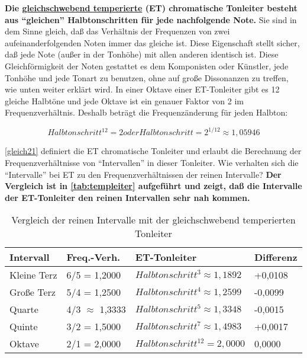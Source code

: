 \label{et1}

\textbf{Die \hyperref[et]{gleichschwebend temperierte} (ET) chromatische Tonleiter besteht aus \enquote{gleichen} Halbtonschritten für jede nachfolgende Note.}
Sie sind in dem Sinne gleich, daß das Verhältnis der Frequenzen von zwei aufeinanderfolgenden Noten immer das gleiche ist.
Diese Eigenschaft stellt sicher, daß jede Note (außer in der Tonhöhe) mit allen anderen identisch ist.
Diese Gleichförmigkeit der Noten gestattet es dem Komponisten oder Künstler, jede Tonhöhe und jede Tonart zu benutzen, ohne auf große Dissonanzen zu treffen, wie unten weiter erklärt wird.
In einer Oktave einer ET-Tonleiter gibt es 12 gleiche Halbtöne und jede Oktave ist ein genauer Faktor von 2 im Frequenzverhältnis.
Deshalb beträgt die Frequenzänderung für jeden Halbton:


\begin{equation}
 \label{gleich21}
 Halbtonschritt^{12} = 2 oder Halbtonschritt = 2^{1/12} \approx 1,05946
\end{equation}


\autoref{gleich21} definiert die ET chromatische Tonleiter und erlaubt die Berechnung der Frequenzverhältnisse von \enquote{Intervallen} in dieser Tonleiter.
Wie verhalten sich die \enquote{Intervalle} bei ET zu den Frequenzverhältnissen der reinen Intervalle?
\textbf{Der Vergleich ist in \autoref{tab:templeiter} aufgeführt und zeigt, daß die Intervalle der ET-Tonleiter den reinen Intervallen sehr nah kommen.}

\begin{table}
 \caption{Vergleich der reinen Intervalle mit der gleichschwebend temperierten Tonleiter}
 \begin{tabular}{l|l|l|l}
 \label{tab:templeiter}
 \textbf{Intervall} & \textbf{Freq.-Verh.} & \textbf{ET-Tonleiter} & \textbf{Differenz} \\
 \hline
 Kleine Terz & 6/5 = 1,2000 & $Halbtonschritt^3 \approx 1,1892$ & +0,0108 \\
 Große Terz & 5/4 = 1,2500 & $Halbtonschritt^4 \approx 1,2599$ & -0,0099 \\
 Quarte & 4/3 $\approx$ 1,3333 & $Halbtonschritt^5 \approx 1,3348$ & -0,0015 \\
 Quinte & 3/2 = 1,5000 & $Halbtonschritt^7 \approx 1,4983$ & +0,0017 \\
 Oktave & 2/1 = 2,0000 & $Halbtonschritt^{12} = 2,0000$ & 0,0000 \\
 \end{tabular}
\end{table}

